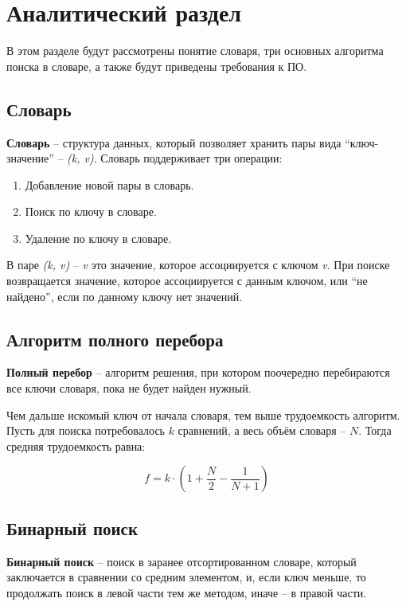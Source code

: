 \chapter{Аналитический раздел}
В этом разделе будут рассмотрены понятие словаря, три основных алгоритма поиска в словаре, 
а также будут приведены требования к ПО.

\section{Словарь}
\textbf{Словарь} \cite{dictionary} -- структура данных, который позволяет хранить пары вида “ключ-значение” -- \textit{(k, v)}. 
Словарь поддерживает три операции:
\begin{enumerate}
	\item Добавление новой пары в словарь.
	\item Поиск по ключу в словаре.
	\item Удаление по ключу в словаре.
\end{enumerate}
В паре \textit{(k, v)} -- \textit{v} это значение, которое ассоциируется с ключом \textit{v}.
При поиске возвращается значение, которое ассоциируется с данным ключом, или “не найдено”, если по данному ключу нет значений.


\section{Алгоритм полного перебора}

\textbf{Полный перебор} \cite{search-full} -- алгоритм решения, при котором поочередно перебираются все ключи словаря, пока не будет найден нужный.

Чем дальше искомый ключ от начала словаря, тем выше трудоемкость алгоритм.
Пусть для поиска потребовалось $k$ сравнений, а весь объём словаря -- $N$.
Тогда средняя трудоемкость равна:

\begin{equation}
f = k \cdot \left(1 + \frac{N}{2} - \frac{1}{N + 1}\right)
\end{equation}


\section{Бинарный поиск}

\textbf{Бинарный поиск} \cite{search-bin} -- поиск в заранее отсортированном словаре, который заключается в сравнении со средним элементом, 
и, если ключ меньше, то продолжать поиск в левой части тем же методом, иначе -- в правой части.

